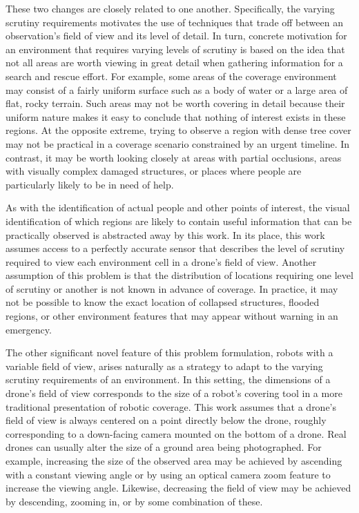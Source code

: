 These two changes are closely related to one another. Specifically, the varying scrutiny requirements motivates the use of techniques that trade off between an observation's field of view and its level of detail. In turn, concrete motivation for an environment that requires varying levels of scrutiny is based on the idea that not all areas are worth viewing in great detail when gathering information for a search and rescue effort. For example, some areas of the coverage environment may consist of a fairly uniform surface such as a body of water or a large area of flat, rocky terrain. Such areas may not be worth covering in detail because their uniform nature makes it easy to conclude that nothing of interest exists in these regions. At the opposite extreme, trying to observe a region with dense tree cover may not be practical in a coverage scenario constrained by an urgent timeline. In contrast, it may be worth looking closely at areas with partial occlusions, areas with visually complex damaged structures, or places where people are particularly likely to be in need of help.

As with the identification of actual people and other points of interest, the visual identification of which regions are likely to contain useful information that can be practically observed is abstracted away by this work. In its place, this work assumes access to a perfectly accurate sensor that describes the level of scrutiny required to view each environment cell in a drone's field of view. Another assumption of this problem is that the distribution of locations requiring one level of scrutiny or another is not known in advance of coverage. In practice, it may not be possible to know the exact location of collapsed structures, flooded regions, or other environment features that may appear without warning in an emergency.

The other significant novel feature of this problem formulation, robots with a variable field of view, arises naturally as a strategy to adapt to the varying scrutiny requirements of an environment. In this setting, the dimensions of a drone's field of view corresponds to the size of a robot's covering tool in a more traditional presentation of robotic coverage. This work assumes that a drone's field of view is always centered on a point directly below the drone, roughly corresponding to a down-facing camera mounted on the bottom of a drone. Real drones can usually alter the size of a ground area being photographed. For example, increasing the size of the observed area may be achieved by ascending with a constant viewing angle or by using an optical camera zoom feature to increase the viewing angle. Likewise, decreasing the field of view may be achieved by descending, zooming in, or by some combination of these.

